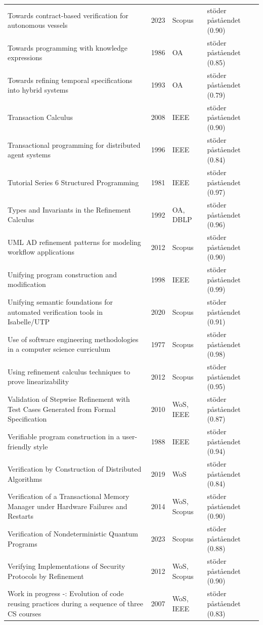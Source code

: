 \begin{longtable}{@{}%
  >{\raggedright\arraybackslash}p{}c%
  >{\raggedright\arraybackslash}p{}%
  >{\raggedright\arraybackslash}p{}@{}}
Towards contract-based verification for autonomous vessels & 2023 & Scopus & stöder påståendet (0.90) \\
Towards programming with knowledge expressions & 1986 & OA & stöder påståendet (0.85) \\
Towards refining temporal specifications into hybrid systems & 1993 & OA & stöder påståendet (0.79) \\
Transaction Calculus & 2008 & IEEE & stöder påståendet (0.90) \\
Transactional programming for distributed agent systems & 1996 & IEEE & stöder påståendet (0.84) \\
Tutorial Series 6 Structured Programming & 1981 & IEEE & stöder påståendet (0.97) \\
Types and Invariants in the Refinement Calculus & 1992 & OA, DBLP & stöder påståendet (0.96) \\
UML AD refinement patterns for modeling workflow applications & 2012 & Scopus & stöder påståendet (0.90) \\
Unifying program construction and modification & 1998 & IEEE & stöder påståendet (0.99) \\
Unifying semantic foundations for automated verification tools in Isabelle/UTP & 2020 & Scopus & stöder påståendet (0.91) \\
Use of software engineering methodologies in a computer science curriculum & 1977 & Scopus & stöder påståendet (0.98) \\
Using refinement calculus techniques to prove linearizability & 2012 & Scopus & stöder påståendet (0.95) \\
Validation of Stepwise Refinement with Test Cases Generated from Formal Specification & 2010 & WoS, IEEE & stöder påståendet (0.87) \\
Verifiable program construction in a user-friendly style & 1988 & IEEE & stöder påståendet (0.94) \\
Verification by Construction of Distributed Algorithms & 2019 & WoS & stöder påståendet (0.84) \\
Verification of a Transactional Memory Manager under Hardware Failures and Restarts & 2014 & WoS, Scopus & stöder påståendet (0.90) \\
Verification of Nondeterministic Quantum Programs & 2023 & Scopus & stöder påståendet (0.88) \\
Verifying Implementations of Security Protocols by Refinement & 2012 & WoS, Scopus & stöder påståendet (0.90) \\
Work in progress -: Evolution of code reusing practices during a sequence of three CS courses & 2007 & WoS, IEEE & stöder påståendet (0.83) \\

\end{longtable}
